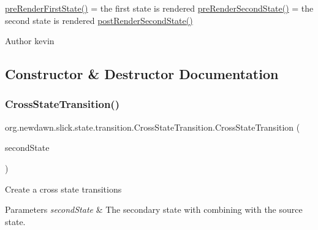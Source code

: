 \mbox{\hyperlink{classorg_1_1newdawn_1_1slick_1_1state_1_1transition_1_1_cross_state_transition_a2b0f6825775c51f909cdabda0feb8d73}{pre\+Render\+First\+State()}} = the first state is rendered \mbox{\hyperlink{classorg_1_1newdawn_1_1slick_1_1state_1_1transition_1_1_cross_state_transition_a87a8c85266ef00b34bbe8888c358aab0}{pre\+Render\+Second\+State()}} = the second state is rendered \mbox{\hyperlink{classorg_1_1newdawn_1_1slick_1_1state_1_1transition_1_1_cross_state_transition_a8b0b46e75abd29cf46e844de048b6227}{post\+Render\+Second\+State()}}

\begin{DoxyAuthor}{Author}
kevin 
\end{DoxyAuthor}


\subsection{Constructor \& Destructor Documentation}
\mbox{\label{classorg_1_1newdawn_1_1slick_1_1state_1_1transition_1_1_cross_state_transition_a0062eac1fd64938d473ca4d6ffaaa6ee}} 
\subsubsection{\texorpdfstring{Cross\+State\+Transition()}{CrossStateTransition()}}
{\footnotesize\ttfamily org.\+newdawn.\+slick.\+state.\+transition.\+Cross\+State\+Transition.\+Cross\+State\+Transition (\begin{DoxyParamCaption}\item[{\mbox{\hyperlink{interfaceorg_1_1newdawn_1_1slick_1_1state_1_1_game_state}{Game\+State}}}]{second\+State }\end{DoxyParamCaption})\hspace{0.3cm}{\ttfamily [inline]}}

Create a cross state transitions


\begin{DoxyParams}{Parameters}
{\em second\+State} & The secondary state with combining with the source state. \\
\hline
\end{DoxyParams}

